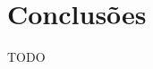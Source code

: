 \begin{comment}
[1]: _K. Sato, K. Higuchi, H. Katsuma, Holographic television by liquid crystal device, in: Third International Conference on Holographic Systems, Components and Applications, 1991, IET, 1991, pp. 20–23._ \
[2]: _H. Yoshikawa, Digital holographic signal processing, in: Proceeding of the TAO First International Symposium, 1993, pp. S–4–2._\
[3]: _H. Yoshikawa, J. Tamai, Holographic image compression by motion picture coding, in: Proceedings of SPIE, 2652, 1996, p. 2._\
[4]: _J. Naughton, Y. Frauel, B. Javidi, E. Tajahuerce, Compression of digital holograms for three-dimensional object reconstruction and recognition, Appl. Opt. 41 (20) (2002)4124–4132._\
[5]: _G.A. Mills, I. Yamaguchi, Effects of quantization in phase-shifting digital holography, Appl. Opt. 44 (7) (2005) 1216–1225._\
[6]: _E. Darakis, J.J. Soraghan, Reconstruction domain compression of phase-shifting digital holograms, Appl. Opt. 46 (3) (2007) 351–356._\
[7]: _Y. Seo, H. Choi, J. Bae, J. Yoo, D. Kim, Data compression technique for digital holograms using a temporally scalable coding method for 2-D images, in: IEEE International Symposium on Signal Processing and Information Technology, 2006, pp. 326–331._\
[8]: _M. Liebling, T. Blu, M. Unser, Fresnelets: new multiresolution wavelet bases for digital holography, IEEE Trans. Image Process.: Publ. IEEE Signal Process. Soc. 12 (1) (2003) 29–43._\
[9]: _J. Peixeiro, C. Brites, J. Ascenso, F. Pereira, Digital holography: Benchmarking coding standards and representation formats, in: IEEE International Conf. on Multimedia and Expo - ICME, 2016_\
[10]: _F. Dufaux, Y. Xing, B. Pesquet-Popescu, P. Schelkens, Compression of digital holographic data: an overview, Proc. SPIE 9599 (2015) 95990I–95990I–11._ \
[11]: _] Y. Xing, M. Kaaniche, B. Pesquet-Popescu, F. Dufaux (Eds.), Digital Holographic Data Representation and Compression, Academic Press, 2016._ \
\end{comment}



\section{Conclusões}
\label{sec::estado-arte:conclusao}

TODO